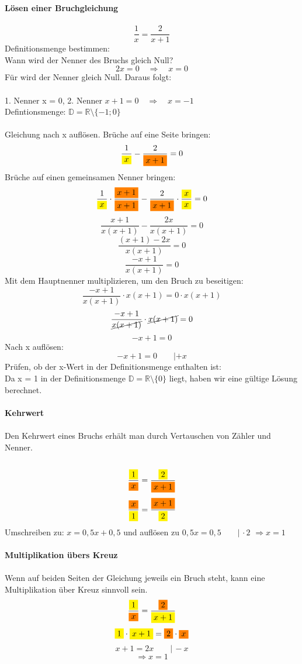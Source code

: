 \documentclass[a4paper,10pt]{article}
\begin{document}
\begin{multicols}{3}
    \textbf{Lösen einer Bruchgleichung}\\~\\
    \[\frac{1}{x} = \frac{2}{x+1}\]
    Definitionsmenge bestimmen: \\
    Wann wird der Nenner des Bruchs gleich Null?
    \[2x = 0 \quad \Rightarrow \quad x = 0\]
    Für wird der Nenner gleich Null. Daraus folgt: \\~\\
    1. Nenner x = 0, 2. Nenner $x + 1 = 0 \quad \Rightarrow \quad x = -1$ \\
    Defintionsmenge: $\mathbb{D} = \mathbb{R} \setminus \{-1; 0\}$ \\~\\
    Gleichung nach x auflösen. Brüche auf eine Seite bringen:
    \[\frac{1}{{\colorbox{yellow}{$x$}}} - \frac{2}{{\colorbox{orange}{$x+1$}}} = 0\]
    Brüche auf einen gemeinsamen Nenner bringen:
    \[\frac{1}{{\colorbox{yellow}{$x$}}} \cdot \frac{{\colorbox{orange}{$x+1$}}}{{\colorbox{orange}{$x+1$}}} - \frac{2}{{\colorbox{orange}{$x+1$}}} \cdot \frac{{\colorbox{yellow}{$x$}}}{{\colorbox{yellow}{$x$}}} = 0\]
    \[\frac{x+1}{x(x+1)} - \frac{2x}{x(x+1)}= 0\]
    \[\frac{(x+1) - 2x}{x(x+1)} = 0\]
    \[\frac{-x + 1}{x(x+1)} = 0\]
    Mit dem Hauptnenner multiplizieren, um den Bruch zu beseitigen:\\
    \[\frac{-x + 1}{x(x+1)} \cdot x(x+1) = 0 \cdot x(x+1)\]
    \[\frac{-x + 1}{\cancel{x(x+1)}} \cdot \cancel{x(x+1)} = 0\]
    \[-x + 1 = 0\]
    Nach x auflösen:
    \[-x + 1 = 0 \qquad |+x\]
    Prüfen, ob der x-Wert in der Definitionsmenge enthalten ist:\\
    Da x = 1 in der Definitionsmenge $\mathbb{D} = \mathbb{R} \setminus \{0\}$ liegt, haben wir eine gültige Lösung berechnet. \\~\\
    \textbf{Kehrwert}\\~\\
    Den Kehrwert eines Bruchs erhält man durch Vertauschen von Zähler und Nenner.\\~\\
    \[\frac{{\colorbox{yellow}{$1$}}}{{\colorbox{orange}{$x$}}} = \frac{{\colorbox{yellow}{$2$}}}{{\colorbox{orange}{$x+1$}}}\]
    \[\frac{{\colorbox{orange}{$x$}}}{{\colorbox{yellow}{$1$}}} = \frac{{\colorbox{orange}{$x+1$}}}{{\colorbox{yellow}{$2$}}}\]
    Umschreiben zu: $x = 0{,}5x + 0{,}5$ und auflösen zu $0{,}5x = 0{,}5 \qquad |\, \cdot 2$ $\Rightarrow x = 1$ \\~\\
    \textbf{Multiplikation übers Kreuz}\\~\\
    Wenn auf beiden Seiten der Gleichung jeweils ein Bruch steht, kann eine Multiplikation über Kreuz sinnvoll sein.
    \[\frac{{\colorbox{yellow}{$1$}}}{{\colorbox{orange}{$x$}}} = \frac{{\colorbox{orange}{$2$}}}{{\colorbox{yellow}{$x+1$}}}\]
    \[{\colorbox{yellow}{$1$}} \cdot {\colorbox{yellow}{$x+1$}} = {\colorbox{orange}{$2$}} \cdot {\colorbox{orange}{$x$}}\]
    \[x+1 = 2x \qquad |\, -x\]
    \[\Rightarrow x = 1\]

\end{multicols}
\end{document}
